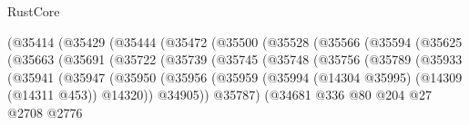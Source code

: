\begin{lexlean}{RustCore}
\begin{coremodule}
                                  (@35414
                                    (@35429
                                      (@35444
                                        (@35472
                                          (@35500
                                            (@35528
                                              (@35566
                                                (@35594
                                                  (@35625
                                                    (@35663
                                                      (@35691
                                                        (@35722
                                                          (@35739
                                                            (@35745
                                                              (@35748
                                                                (@35756
                                                                  (@35789
                                                                    (@35933
                                                                      (@35941
                                                                        (@35947
                                                                          (@35950
                                                                            (@35956
                                                                              (@35959
                                                                                (@35994
                                                                                  (@14304 @35995)
                                                                                  (@14309
                                                                                    (@14311 @453))
                                                                                  @14320))
                                                                              @34905))
                                                                          @35787)
                                                                        (@34681
                                                                          @336
                                                                          @80
                                                                          @204
                                                                          @27
                                                                          @2708
                                                                          @2776

\end{coremodule}
\end{lexlean}

